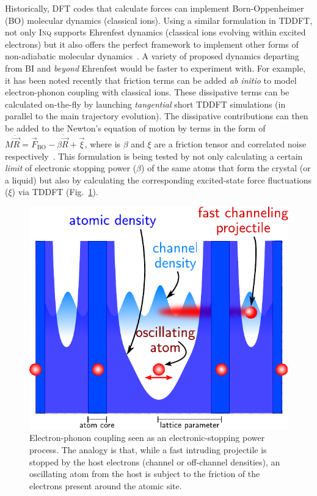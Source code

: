 Historically, DFT codes that calculate forces can implement Born-Oppenheimer (BO) molecular dynamics (classical ions).
Using a similar formulation in TDDFT, not only \textsc{Inq} supports Ehrenfest dynamics (classical ions evolving within excited electrons) but it also offers the perfect framework to implement other forms of non-adiabatic molecular dynamics~\cite{Tapavicza2013,Curchod2018}. 
A variety of proposed dynamics departing from BI and \emph{beyond} Ehrenfest would be faster to experiment with.
For example, it has been noted recently that friction terms can be added \emph{ab initio} to model electron-phonon coupling with classical ions.
These dissipative terms can be calculated on-the-fly by launching \emph{tangential} short TDDFT simulations (in parallel to the main trajectory evolution).
The dissipative contributions can then be added to the Newton's equation of motion by terms in the form of \(M \ddot{\vec{R}} = \vec{F}_\text{BO} - \beta\dot{\vec{R}} + \vec{\xi}\), where is \(\beta\) and \(\xi\) are a friction tensor and correlated noise respectively~\cite{Tamm2018}.
This formulation is being tested by not only calculating a certain \emph{limit} of electronic stopping power (\(\beta\)) of the same atoms that form the crystal (or a liquid) but also by calculating the corresponding excited-state force fluctuations (\(\xi\)) via TDDFT (Fig.~\ref{fig:stopping_eph}).

\begin{figure}
\centering
\includegraphics[width=0.66\columnwidth]{figures/stopping_eph}
\caption{
	Electron-phonon coupling seen as an electronic-stopping power process. 
	The analogy is that, while a fast intruding projectile is stopped by the host electrons (channel or off-channel densities), an oscillating atom from the host is subject to the friction of the electrons present around the atomic site.
}
\label{fig:stopping_eph}
\end{figure}

